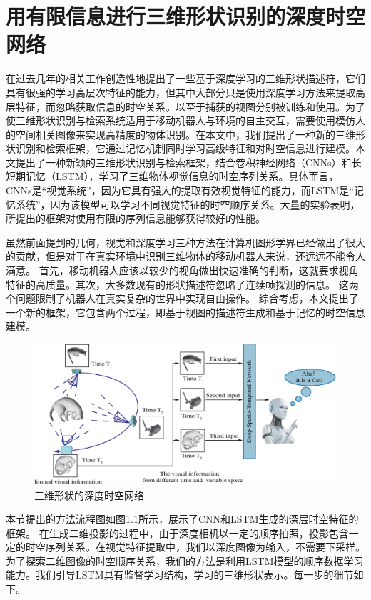
\chapter{用有限信息进行三维形状识别的深度时空网络}

在过去几年的相关工作创造性地提出了一些基于深度学习的三维形状描述符，它们具有很强的学习高层次特征的能力，但其中大部分只是使用深度学习方法来提取高层特征，而忽略获取信息的时空关系。以至于捕获的视图分别被训练和使用。为了使三维形状识别与检索系统适用于移动机器人与环境的自主交互，需要使用模仿人的空间相关图像来实现高精度的物体识别。在本文中，我们提出了一种新的三维形状识别和检索框架，它通过记忆机制同时学习高级特征和对时空信息进行建模。本文提出了一种新颖的三维形状识别与检索框架，结合卷积神经网络（CNNs）和长短期记忆（LSTM），学习了三维物体视觉信息的时空序列关系。具体而言， CNNs是“视觉系统”，因为它具有强大的提取有效视觉特征的能力，而LSTM是“记忆系统”，因为该模型可以学习不同视觉特征的时空顺序关系。大量的实验表明，所提出的框架对使用有限的序列信息能够获得较好的性能。

虽然前面提到的几何，视觉和深度学习三种方法在计算机图形学界已经做出了很大的贡献，但是对于在真实环境中识别三维物体的移动机器人来说，还远远不能令人满意。 首先，移动机器人应该以较少的视角做出快速准确的判断，这就要求视角特征的高质量。其次，大多数现有的形状描述符忽略了连续帧探测的信息。 这两个问题限制了机器人在真实复杂的世界中实现自由操作。 综合考虑，本文提出了一个新的框架，它包含两个过程，即基于视图的描述符生成和基于记忆的时空信息建模。

\begin{figure}[tbh]
\begin{center}
 \includegraphics[width=0.98\linewidth]{figures/flowchart.eps}
 \end{center} \vspace{-4mm}
\caption{三维形状的深度时空网络} 
\label{flowchart4}
\end{figure}

本节提出的方法流程图如图\ref{flowchart4}所示，展示了CNN和LSTM生成的深层时空特征的框架。 在生成二维投影的过程中，由于深度相机以一定的顺序拍照，投影包含一定的时空序列关系。在视觉特征提取中，我们以深度图像为输入，不需要下采样。为了探索二维图像的时空顺序关系，我们的方法是利用LSTM模型的顺序数据学习能力。我们引导LSTM具有监督学习结构，学习的三维形状表示。每一步的细节如下。

